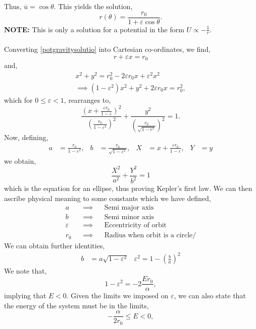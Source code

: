\documentclass{book}
\begin{document}
Thus, $\overline{u} = \cos\theta$. This yields the solution,
\begin{equation}
    r(\theta) = \frac{r_0}{1 + \varepsilon\cos\theta}. \label{potgravitysolutio}
\end{equation}
\textbf{NOTE:} This is only a solution for a potential in the form $U \propto -\frac{1}{r}$. \\\\
Converting \eqref{potgravitysolutio} into Cartesian co-ordinates, we find,
\begin{equation}
    r + \varepsilon x = r_0
\end{equation}
and,
\begin{equation}
\begin{split}
    x^2 + y^2 = r_0^2 -2\varepsilon r_0 x + \varepsilon^2x^2 \\
    \implies (1 - \varepsilon^2)x^2 + y^2 + 2\varepsilon r_0x = r_0^2, \label{quadmotion}
\end{split}
\end{equation}
which for $0 \leq \varepsilon < 1$, rearranges to,
\begin{equation}
    \frac{\left(x + \frac{\varepsilon r_0}{1-\varepsilon}\right)^2}{\left(\frac{r_0}{1-\varepsilon^2}\right)^2} + \frac{y^2}{\left(\frac{r_0}{\sqrt{1-\epsilon^2}}\right)^2}  = 1.
\end{equation}
Now, defining,
\begin{align}
    a & = \frac{r_0}{1-\varepsilon^2}, & b & = \frac{r_0}{\sqrt{1-\varepsilon^2}}, & X &= x + \frac{\varepsilon r_0}{1-\varepsilon}, & Y &= y
\end{align}
we obtain,
\begin{equation}
    \frac{X^2}{a^2} + \frac{Y^2}{b^2} = 1
\end{equation}
which is the equation for an ellipse, thus proving Kepler's first law. We can then ascribe physical meaning to some constants which we have defined,
\begin{align}
    a && \implies && \text{Semi major axis} \\
    b && \implies && \text{Semi minor axis} \\
    \varepsilon && \implies && \text{Eccentricity of orbit} \\
    r_0 && \implies && \text{Radius when orbit is a circle/}
\end{align}
We can obtain further identities,
\begin{align}
    b &= a \sqrt{1 - \varepsilon^2} & \varepsilon^2 = 1 - \left(\frac{b}{a}\right)^2
\end{align}
We note that,
\begin{equation}
    1 - \varepsilon^2 = -2\frac{Er_0}{\alpha},    
\end{equation}
implying that $E < 0$. Given the limits we imposed on $\varepsilon$, we can also state that the energy of the system must be in the limits,
\begin{equation}
    -\frac{\alpha}{2r_0} \leq E < 0,
\end{equation}
\end{document}
